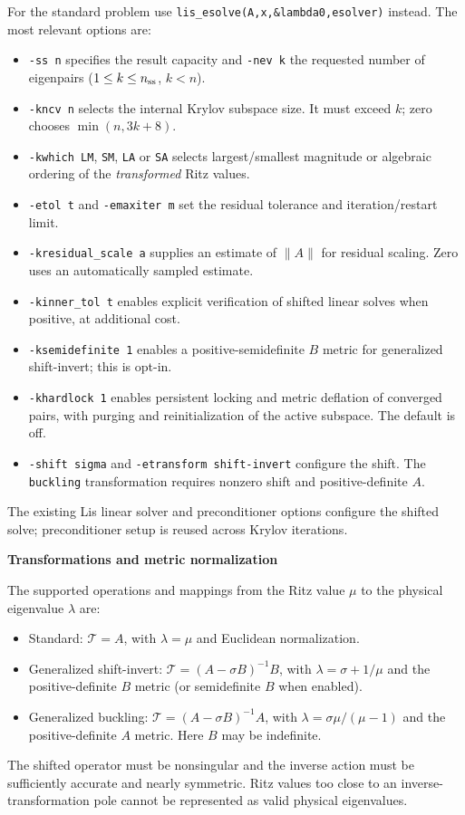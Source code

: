 \documentclass[a4paper]{article}
\begin{document}
For the standard problem use
\verb|lis_esolve(A,x,&lambda0,esolver)| instead.
The most relevant options are:
\begin{itemize}
\item \verb|-ss n| specifies the result capacity and
\verb|-nev k| the requested number of eigenpairs
($1\leq k\leq n_{\rm ss}$, $k<n$).
\item \verb|-kncv n| selects the internal Krylov subspace size.
It must exceed $k$; zero chooses $\min(n,3k+8)$.
\item \verb|-kwhich LM|, \verb|SM|, \verb|LA| or \verb|SA|
selects largest/smallest magnitude or algebraic ordering
of the \emph{transformed} Ritz values.
\item \verb|-etol t| and \verb|-emaxiter m| set the residual
tolerance and iteration/restart limit.
\item \verb|-kresidual_scale a| supplies an estimate of
$\| A\|$ for residual scaling. Zero uses an
automatically sampled estimate.
\item \verb|-kinner_tol t| enables explicit verification of
shifted linear solves when positive, at additional cost.
\item \verb|-ksemidefinite 1| enables a positive-semidefinite
$B$ metric for generalized shift-invert; this is opt-in.
\item \verb|-khardlock 1| enables persistent locking and
metric deflation of converged pairs, with purging and
reinitialization of the active subspace. The default is off.
\item \verb|-shift sigma| and
\verb|-etransform shift-invert| configure the shift.
The \verb|buckling| transformation requires nonzero shift
and positive-definite $A$.
\end{itemize}
The existing Lis linear solver and preconditioner options
configure the shifted solve; preconditioner setup is reused
across Krylov iterations.

\noindent
{\bf Transformations and metric normalization}

The supported operations and mappings from the Ritz value
$\mu$ to the physical eigenvalue $\lambda$ are:
\begin{itemize}
\item Standard: $\mathcal{T}=A$, with $\lambda=\mu$
and Euclidean normalization.
\item Generalized shift-invert:
$\mathcal{T}=(A-\sigma B)^{-1}B$, with
$\lambda=\sigma+1/\mu$ and the positive-definite
$B$ metric (or semidefinite $B$ when enabled).
\item Generalized buckling:
$\mathcal{T}=(A-\sigma B)^{-1}A$, with
$\lambda=\sigma\mu/(\mu-1)$ and the
positive-definite $A$ metric. Here $B$ may be indefinite.
\end{itemize}
The shifted operator must be nonsingular and the inverse
action must be sufficiently accurate and nearly symmetric.
Ritz values too close to an inverse-transformation pole
cannot be represented as valid physical eigenvalues.
\end{document}
